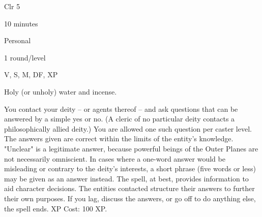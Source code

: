 
\begin{description*}
\item[Level:] Clr 5
\item[Casting Time:] 10 minutes
\item[Range:] Personal
\item[Duration:] 1 round/level
\item[Components:] V, S, M, DF, XP
\item[Arcane Material Component:] Holy (or unholy) water and incense.
\end{description*}

You contact your deity -- or agents thereof  -- and ask questions that can be answered
by a simple yes or no. (A cleric of no particular deity contacts a philosophically
allied deity.) You are allowed one such question per caster level. The answers
given are correct within the limits of the entity's knowledge. "Unclear" is a
legitimate answer, because powerful beings of the Outer Planes are not necessarily
omniscient. In cases where a one-word answer would be misleading or contrary to
the deity's interests, a short phrase (five words or less) may be given as an answer
instead.
The spell, at best, provides information to aid character decisions. The entities
contacted structure their answers to further their own purposes. If you lag, discuss
the answers, or go off to do anything else, the spell ends.
XP Cost: 100 XP.